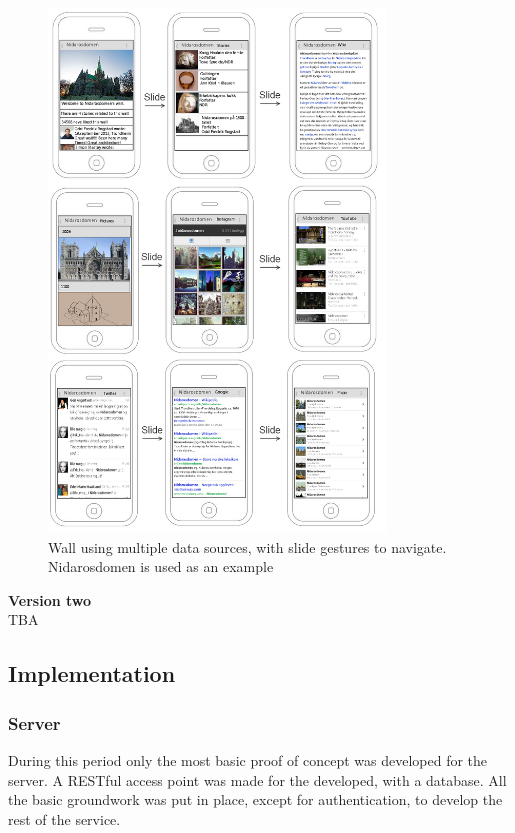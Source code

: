 \documentclass[11pt]{book}
\begin{document}
\begin{figure}[H]
    \centering
    \includegraphics[width=0.8\textwidth]{Figures/Phases/Sprint1/versiononeMultipleDataSourcesWall2.png}
    \caption{Wall using multiple data sources, with slide gestures to navigate. Nidarosdomen is used as an example}
    \label{fig:phases_sprint1_uiVersionOneMultipleDataSoruces}
\end{figure}

\textbf{Version two}\\
TBA

\subsection{Implementation}

\subsubsection{Server}
During this period only the most basic proof of concept was developed for the server. A RESTful access point was made for the developed, with a database. All the basic groundwork was put in place, except for authentication, to develop the rest of the service.
\end{document}

